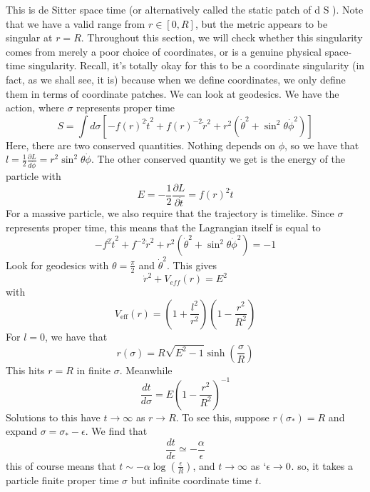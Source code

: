 This is de Sitter space time (or alternatively called the static patch of 
d S ). Note that we have a valid range from $ r \in [ 0 , R ] $, but the 
metric appears to be singular at $ r = R $. Throughout this section, 
we will check whether this singularity comes 
from merely a poor choice of coordinates, or is a genuine
physical space-time singularity. 
Recall, it's totally okay for this to be a coordinate singularity 
(in fact, as we shall see, it is) because 
when we define coordinates,  we only define them 
in terms of coordinate patches. 
We can look at geodesics. We have the action, where $ \sigma $ represents proper time 
\[
 S  = \int d \sigma \left[  
 - f ( r) ^ 2 \dot{t } ^ 2 + f ( r) ^{ - 2 } \dot{ r } ^ 2 
 + r ^ 2 \left(  \dot{ \theta } ^ 2 + \sin ^ 2 \theta \dot{ \phi  }  ^ 2  \right)  \right] 
\] Here, 
there are two conserved quantities. Nothing depends on $ \phi $, 
so we have that 
$ l = \frac{1}{2 } \frac{\partial  L }{ d \dot{\phi }  } = r ^ 2 \sin ^ 2 \theta \dot{\phi  } $. 
The other conserved quantity we get is the energy of the particle with 
\[
	E =  - \frac{1}{2 } \frac{\partial  L }{\partial  \dot{ t } } = f ( r) ^ 2 
	\dot{t }  
\] For a massive particle, 
we also require that the trajectory is timelike.
Since $ \sigma  $ represents proper time, this means 
that the Lagrangian itself is equal to 
\[
 - f ^ 2 \dot{ t } ^ 2 + f ^{ - 2 } \dot{ r } ^ 2 + r ^ 2 
 ( \dot{ \theta } ^ 2 + \sin ^ 2 \theta  \dot{ \phi } ^ 2  ) = - 1  
\]
Look for geodesics with $ \theta = \frac{\pi }{ 2 } $ and $ \dot{ \theta } ^ 2  $. 
This gives 
\[
	\dot{ r } ^ 2 + V_{ eff} ( r)  = E ^ 2  
\] with 
\[
	V_{ \text{eff} }( r) = ( 1 + \frac{l ^ 2 }{ r ^ 2 } ) ( 1 - \frac{ r ^  2 }{R ^ 2  } ) 
\] For $ l  = 0 $, we have that 
\[
	r ( \sigma)  = R \sqrt{ E ^ 2 - 1}  \sinh ( \frac{ \sigma }{ R } ) 
\]  This hits $ r = R $ in finite $ \sigma $. Meanwhile 
\[
	\frac{ d t }{ d \sigma } = E \left(  1 - \frac{ r ^ 2 }{ R ^ 2 }  \right)  ^{ - 1}
\] Solutions to this have $ t \to \infty $ as $ r \to R $. 
To see this, suppose $ r ( \sigma _ * )  = R $ and expand $ \sigma = \sigma_{ * }  - \epsilon $. 
We find that 
\[
 \frac{ d t }{ d \epsilon } \simeq  - \frac{ \alpha }{ \epsilon } 
\] this of course means that $ t \sim  - \alpha \log ( \frac{ \epsilon }{ R } ) $, 
and $ t \to \infty $ as $ `\epsilon \to 0 $. 
so, it takes a particle finite proper time  $ \sigma $ but infinite 
coordinate time $ t $.


